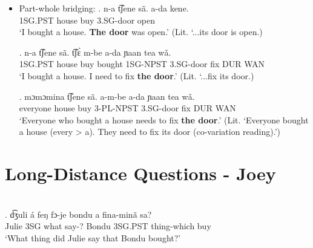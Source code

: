 \documentclass{assets/fieldnotes}
\begin{document}
\begin{itemize}
    \item Part-whole bridging:
    \exg. n-a t͡ʃene sã. a-da kene.\\
        1SG.PST house buy 3.SG-door open\\
        `I bought a house. \textbf{The door} was open.' (Lit. `...its door is open.)

    \exg. n-a t͡ʃene sã. t͡ʃɛ̀ m-be a-da ɲaan tea wǎ.\\
        1SG.PST house buy bought 1SG-NPST 3.SG-door fix DUR WAN\\
        `I bought a house. I need to fix \textbf{the door}.' (Lit. `...fix its door.)

    \exg. mɔmɔmina t͡ʃene sã. a-m-be a-da ɲaan tea wǎ.\\
        everyone house buy 3-PL-NPST 3.SG-door fix DUR WAN\\
        `Everyone who bought a house needs to fix \textbf{the door}.' (Lit. `Everyone bought a house (every > a). They need to fix its door (co-variation reading).')


\end{itemize}


\section{Long-Distance Questions - Joey}

\\


\exg. d͡ʒuli á feŋ fɔ-je bondu a fina-minã sa?\\
Julie 3SG what say-? Bondu 3SG.PST thing-which buy\\
`What thing did Julie say that Bondu bought?'\\ 
\end{document}
